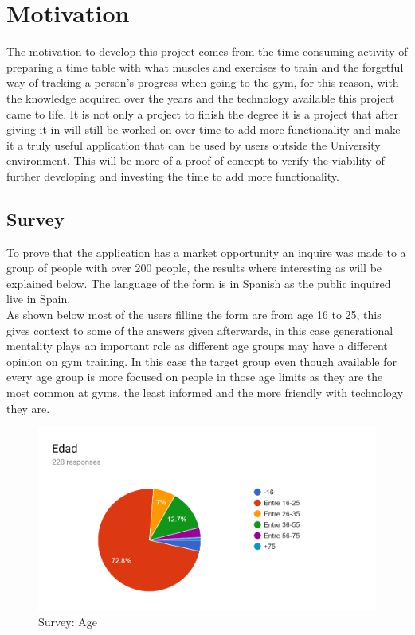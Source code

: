 \section{Motivation}\label{sec:chap1_moti}
The motivation to develop this project comes from the time-consuming activity of preparing a time table with what muscles and exercises to train and the forgetful way of tracking a person’s progress when going to the gym, for this reason, with the knowledge acquired over the years and the technology available this project came to life. It is not only a project to finish the degree it is a project that after giving it in will still be worked on over time to add more functionality and make it a truly useful application that can be used by users outside the University environment. This will be more of a proof of concept to verify the viability of further developing and investing the time to add more functionality.

\subsection{Survey}\label{sec:chap1_reas_app}

To prove that the application has a market opportunity an inquire was made to a group of people with over 200 people, the results where interesting as will be explained below. The language of the form is in Spanish as the public inquired live in Spain.\\

As shown below most of the users filling the form are from age 16 to 25, this gives context to some of the answers given afterwards, in this case generational mentality plays an important role as different age groups may have a different opinion on gym training. In this case the target group even though available for every age group is more focused on people in those age limits as they are the most common at gyms, the least informed and the more friendly with technology they are.

\begin{center}
	\begin{figure}[h!]
		\centering
		\includegraphics[scale=1]{./images/4-age}
		\caption{Survey: Age}
		\label{4_age}
	\end{figure}
\end{center}

